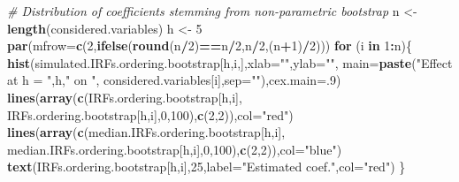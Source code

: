 \documentclass[
  12pt,
]{book}
\newenvironment{Shaded}{\begin{snugshade}}{\end{snugshade}}
\newcommand{\AttributeTok}[1]{\textcolor[rgb]{0.13,0.29,0.53}{#1}}
\newcommand{\CommentTok}[1]{\textcolor[rgb]{0.56,0.35,0.01}{\textit{#1}}}
\newcommand{\ControlFlowTok}[1]{\textcolor[rgb]{0.13,0.29,0.53}{\textbf{#1}}}
\newcommand{\DecValTok}[1]{\textcolor[rgb]{0.00,0.00,0.81}{#1}}
\newcommand{\FunctionTok}[1]{\textcolor[rgb]{0.13,0.29,0.53}{\textbf{#1}}}
\newcommand{\NormalTok}[1]{#1}
\newcommand{\OtherTok}[1]{\textcolor[rgb]{0.56,0.35,0.01}{#1}}
\newcommand{\SpecialCharTok}[1]{\textcolor[rgb]{0.81,0.36,0.00}{\textbf{#1}}}
\newcommand{\StringTok}[1]{\textcolor[rgb]{0.31,0.60,0.02}{#1}}
\theoremstyle{definition}
\theoremstyle{definition}
\theoremstyle{definition}
\theoremstyle{definition}
\theoremstyle{remark}
\begin{document}
\begin{Shaded}
\begin{Highlighting}[]
\CommentTok{\# Distribution of coefficients stemming from non{-}parametric bootstrap}
\NormalTok{n }\OtherTok{\textless{}{-}} \FunctionTok{length}\NormalTok{(considered.variables)}
\NormalTok{h }\OtherTok{\textless{}{-}} \DecValTok{5}
\FunctionTok{par}\NormalTok{(}\AttributeTok{mfrow=}\FunctionTok{c}\NormalTok{(}\DecValTok{2}\NormalTok{,}\FunctionTok{ifelse}\NormalTok{(}\FunctionTok{round}\NormalTok{(n}\SpecialCharTok{/}\DecValTok{2}\NormalTok{)}\SpecialCharTok{==}\NormalTok{n}\SpecialCharTok{/}\DecValTok{2}\NormalTok{,n}\SpecialCharTok{/}\DecValTok{2}\NormalTok{,(n}\SpecialCharTok{+}\DecValTok{1}\NormalTok{)}\SpecialCharTok{/}\DecValTok{2}\NormalTok{)))}
\ControlFlowTok{for}\NormalTok{ (i }\ControlFlowTok{in} \DecValTok{1}\SpecialCharTok{:}\NormalTok{n)\{}
  \FunctionTok{hist}\NormalTok{(simulated.IRFs.ordering.bootstrap[h,i,],}\AttributeTok{xlab=}\StringTok{""}\NormalTok{,}\AttributeTok{ylab=}\StringTok{""}\NormalTok{,}
       \AttributeTok{main=}\FunctionTok{paste}\NormalTok{(}\StringTok{"Effect at h = "}\NormalTok{,h,}\StringTok{" on "}\NormalTok{,}
\NormalTok{                  considered.variables[i],}\AttributeTok{sep=}\StringTok{""}\NormalTok{),}\AttributeTok{cex.main=}\NormalTok{.}\DecValTok{9}\NormalTok{)}
  \FunctionTok{lines}\NormalTok{(}\FunctionTok{array}\NormalTok{(}\FunctionTok{c}\NormalTok{(IRFs.ordering.bootstrap[h,i],}
\NormalTok{                IRFs.ordering.bootstrap[h,i],}\DecValTok{0}\NormalTok{,}\DecValTok{100}\NormalTok{),}\FunctionTok{c}\NormalTok{(}\DecValTok{2}\NormalTok{,}\DecValTok{2}\NormalTok{)),}\AttributeTok{col=}\StringTok{"red"}\NormalTok{)}
  \FunctionTok{lines}\NormalTok{(}\FunctionTok{array}\NormalTok{(}\FunctionTok{c}\NormalTok{(median.IRFs.ordering.bootstrap[h,i],}
\NormalTok{                median.IRFs.ordering.bootstrap[h,i],}\DecValTok{0}\NormalTok{,}\DecValTok{100}\NormalTok{),}\FunctionTok{c}\NormalTok{(}\DecValTok{2}\NormalTok{,}\DecValTok{2}\NormalTok{)),}\AttributeTok{col=}\StringTok{"blue"}\NormalTok{)}
  \FunctionTok{text}\NormalTok{(IRFs.ordering.bootstrap[h,i],}\DecValTok{25}\NormalTok{,}\AttributeTok{label=}\StringTok{"Estimated coef."}\NormalTok{,}\AttributeTok{col=}\StringTok{"red"}\NormalTok{)}
\NormalTok{\}}
\end{Highlighting}
\end{Shaded}
\end{document}
